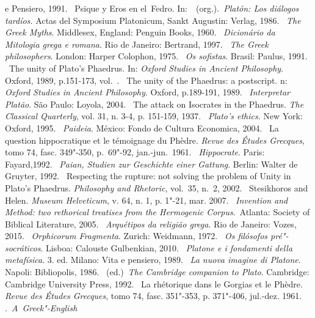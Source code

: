 \begin{bibliohedra}
  e Pensiero, 1991.
~Psique y Eros en el~Fedro. In:~~(org.).~\emph{Platón: Los
  diálogos tardíos.} Actas del Symposium
  Platonicum, Sankt Augustin: Verlag, 1986.
~\emph{The Greek Myths}. Middlesex, England: Penguin Books, 1960.
~\emph{Dicionário da Mitologia grega e romana}. Rio de
  Janeiro: Bertrand, 1997.
~\emph{The Greek philosophers}. London: Harper
  Colophon, 1975.
~\emph{Os sofistas}. Brasil: Paulus, 1991.
~The unity of Plato's Phaedrus. In: \emph{Oxford Studies in
  Ancient Philosophy}. Oxford, 1989, p.151-173, vol.~. 
~The unity of the Phaedrus: a postscript. n: \emph{Oxford Studies in
  Ancient Philosophy}. Oxford, p.189-191, 1989.
~\emph{Interpretar Platão}. São Paulo: Loyola, 2004.
~The attack on Isocrates in the Phaedrus. \emph{The
  Classical Quarterly}, vol. 31, n. 3-4, p. 151-159, 1937.
~\emph{Plato's ethics}. New York: Oxford, 1995.
~\emph{Paideia}. México: Fondo de Cultura Economica, 2004.
~La question hippocratique et le témoignage du Phèdre. \emph{Revue des Études Grecques}, tomo 74, fasc. 349"-350, p.~69"-92, jan.-jun.~1961.
~\emph{Hippocrate}. Paris: Fayard,1992.
~\emph{Paian, Studien zur Geschichte einer Gattung}.
  Berlin: Walter de Gruyter, 1992.
~Respecting the rupture: not solving the problem
  of Unity in Plato's Phaedrus. \emph{Philosophy and Rhetoric}, vol.~35, n.~2, 2002.
~Stesikhoros and Helen. \emph{Museum Helveticum}, v.
  64, n. 1, p. 1"-21, mar. 2007.
~\emph{Invention and Method: two rethorical treatises
  from the Hermogenic Corpus}.~Atlanta: Society of Biblical Literature,
  2005.
~\emph{Arquétipos da religião grega}. Rio de Janeiro:
  Vozes, 2015.
~\emph{Orphicorum Fragmenta}. Zurich: Weidmann, 1972.
~\emph{Os filósofos
  pré"-socráticos}. Lisboa: Calouste Gulbenkian, 2010.
~\emph{Platone e i fondamenti della metafísica}. 3. ed. Milano:
  Vita e pensiero, 1989.
~\emph{La nuova imagine di Platone}. Napoli: Bibliopolis,
  1986.
~(ed.)~\emph{The Cambridge companion to Plato}. Cambridge:
  Cambridge University Press, 1992.
~La rhétorique dans le Gorgias et le Phèdre. \emph{Revue des Études Grecques}, tomo 74, fasc. 351"-353, p. 371"-406, jul.-dez. 1961.
 .~\emph{A~Greek"-English
}
\end{bibliohedra}
